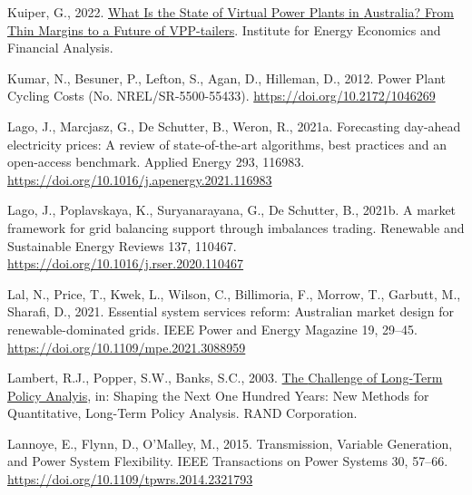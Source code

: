 \documentclass[12pt,a4paper,]{report}
\newlength{\cslhangindent}
\newenvironment{CSLReferences}[2] %
 {%
  \setlength{\parindent}{0pt}
  \ifodd #1 \everypar{\setlength{\hangindent}{\cslhangindent}}\ignorespaces\fi
  \ifnum #2 > 0
  \setlength{\parskip}{#2\baselineskip}
  \fi
 }%
 {}
\begin{document}
\begin{CSLReferences}{1}{0}
\leavevmode{}%
Kuiper, G., 2022.
\href{https://ieefa.org/wp-content/uploads/2022/03/What-Is-the-State-of-Virtual-Power-Plants-in-Australia_March-2022_2.pdf}{What
{Is} the {State} of {Virtual Power Plants} in {Australia}? {From Thin
Margins} to a {Future} of {VPP-tailers}}. {Institute for Energy
Economics and Financial Analysis}.

\leavevmode{}%
Kumar, N., Besuner, P., Lefton, S., Agan, D., Hilleman, D., 2012. Power
{Plant Cycling Costs} (No. NREL/SR-5500-55433).
\url{https://doi.org/10.2172/1046269}

\leavevmode{}%
Lago, J., Marcjasz, G., De Schutter, B., Weron, R., 2021a. Forecasting
day-ahead electricity prices: {A} review of state-of-the-art algorithms,
best practices and an open-access benchmark. Applied Energy 293, 116983.
\url{https://doi.org/10.1016/j.apenergy.2021.116983}

\leavevmode{}%
Lago, J., Poplavskaya, K., Suryanarayana, G., De Schutter, B., 2021b. A
market framework for grid balancing support through imbalances trading.
Renewable and Sustainable Energy Reviews 137, 110467.
\url{https://doi.org/10.1016/j.rser.2020.110467}

\leavevmode{}%
Lal, N., Price, T., Kwek, L., Wilson, C., Billimoria, F., Morrow, T.,
Garbutt, M., Sharafi, D., 2021. Essential system services reform:
{Australian} market design for renewable-dominated grids. IEEE Power and
Energy Magazine 19, 29--45.
\url{https://doi.org/10.1109/mpe.2021.3088959}

\leavevmode{}%
Lambert, R.J., Popper, S.W., Banks, S.C., 2003.
\href{https://www.jstor.org/stable/10.7249/mr1626rpc.9?seq=5}{The
{Challenge} of {Long-Term Policy Analyis}}, in: Shaping the {Next One
Hundred Years}: {New Methods} for {Quantitative}, {Long-Term Policy
Analysis}. {RAND Corporation}.

\leavevmode{}%
Lannoye, E., Flynn, D., O'Malley, M., 2015. Transmission, {Variable
Generation}, and {Power System Flexibility}. IEEE Transactions on Power
Systems 30, 57--66. \url{https://doi.org/10.1109/tpwrs.2014.2321793}


\end{CSLReferences}
\end{document}
